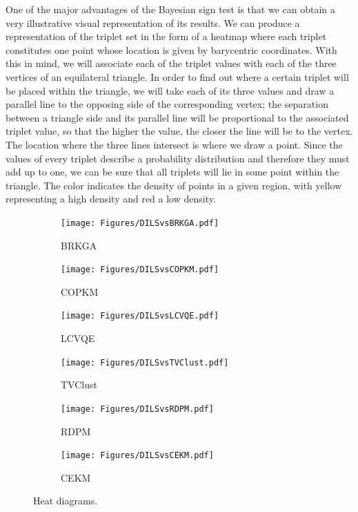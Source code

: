 \documentclass[review]{elsarticle}
\begin{document}
One of the major advantages of the Bayesian sign test is that we can obtain a very illustrative visual representation of its results. We can produce a representation of the triplet set in the form of a heatmap where each triplet constitutes one point whose location is given by barycentric coordinates. With this in mind, we will associate each of the triplet values with each of the three vertices of an equilateral triangle. In order to find out where a certain triplet will be placed within the triangle, we will take each of its three values and draw a parallel line to the opposing side of the corresponding vertex; the separation between a triangle side and its parallel line will be proportional to the associated triplet value, so that the higher the value, the closer the line will be to the vertex. The location where the three lines intersect is where we draw a point. Since the values of every triplet describe a probability distribution and therefore they must add up to one, we can be sure that all triplets will lie in some point within the triangle. The color indicates the density of points in a given region, with yellow representing a high density and red a low density.

\begin{figure}[ht!]
	\centering
	\begin{subfigure}{.45\textwidth}
		\texttt{[image: Figures/DILSvsBRKGA.pdf]}
		\caption{BRKGA}
		\label{fig:DILSvsBRKGA}
	\end{subfigure}
	\begin{subfigure}{.45\textwidth}
		\texttt{[image: Figures/DILSvsCOPKM.pdf]}
		\caption{COPKM}
		\label{fig:DILSvsCOPKM}
	\end{subfigure}
	\begin{subfigure}{.45\textwidth}
		\texttt{[image: Figures/DILSvsLCVQE.pdf]}
		\caption{LCVQE}
		\label{fig:DILSvsLCVQE}
	\end{subfigure}
	\begin{subfigure}{.45\textwidth}
		\texttt{[image: Figures/DILSvsTVClust.pdf]}
		\caption{TVClust}
		\label{fig:DILSvsTVClust}
	\end{subfigure}
	\begin{subfigure}{.45\textwidth}
		\texttt{[image: Figures/DILSvsRDPM.pdf]}
		\caption{RDPM}
		\label{fig:DILSvsRDPM}
	\end{subfigure}
	\begin{subfigure}{.45\textwidth}
		\texttt{[image: Figures/DILSvsCEKM.pdf]}
		\caption{CEKM}
		\label{fig:DILSvsCEKM}
	\end{subfigure}
	\caption{Heat diagrams.}
\end{figure}
\end{document}

